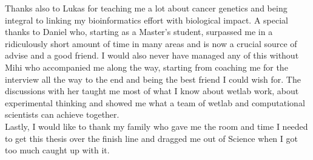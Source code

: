 Thanks also to Lukas for teaching me a lot about cancer genetics and being integral to linking my bioinformatics effort with biological impact. A special thanks to Daniel who, starting as a Master's student, surpassed me in a ridiculously short amount of time in many areas and is now a crucial source of advise and a good friend. I would also never have managed any of this without Mihi who accompanied me along the way, starting from coaching me for the interview all the way to the end and being the best friend I could wish for. The discussions with her taught me most of what I know about wetlab work, about experimental thinking and showed me what a team of wetlab and computational scientists can achieve together. \\
Lastly, I would like to thank my family who gave me the room and time I needed to get this thesis over the finish line and dragged me out of Science when I got too much caught up with it.